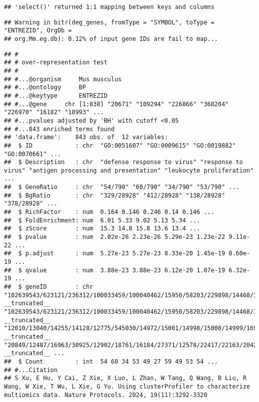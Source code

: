 \documentclass[
]{article}
\newenvironment{Shaded}{\begin{snugshade}}{\end{snugshade}}
\newcommand{\AttributeTok}[1]{\textcolor[rgb]{0.13,0.29,0.53}{#1}}
\newcommand{\CommentTok}[1]{\textcolor[rgb]{0.56,0.35,0.01}{\textit{#1}}}
\newcommand{\FunctionTok}[1]{\textcolor[rgb]{0.13,0.29,0.53}{\textbf{#1}}}
\newcommand{\NormalTok}[1]{#1}
\newcommand{\OtherTok}[1]{\textcolor[rgb]{0.56,0.35,0.01}{#1}}
\newcommand{\SpecialCharTok}[1]{\textcolor[rgb]{0.81,0.36,0.00}{\textbf{#1}}}
\newcommand{\StringTok}[1]{\textcolor[rgb]{0.31,0.60,0.02}{#1}}
\begin{document}
\begin{verbatim}
## 'select()' returned 1:1 mapping between keys and columns
\end{verbatim}

\begin{verbatim}
## Warning in bitr(deg_genes, fromType = "SYMBOL", toType = "ENTREZID", OrgDb =
## org.Mm.eg.db): 0.12% of input gene IDs are fail to map...
\end{verbatim}

\begin{Shaded}
\end{Shaded}

\begin{verbatim}
## #
## # over-representation test
## #
## #...@organism     Mus musculus 
## #...@ontology     BP 
## #...@keytype      ENTREZID 
## #...@gene     chr [1:838] "20671" "109294" "226866" "368204" "226970" "16182" "18993" ...
## #...pvalues adjusted by 'BH' with cutoff <0.05 
## #...843 enriched terms found
## 'data.frame':    843 obs. of  12 variables:
##  $ ID            : chr  "GO:0051607" "GO:0009615" "GO:0019882" "GO:0070661" ...
##  $ Description   : chr  "defense response to virus" "response to virus" "antigen processing and presentation" "leukocyte proliferation" ...
##  $ GeneRatio     : chr  "54/790" "60/790" "34/790" "53/790" ...
##  $ BgRatio       : chr  "329/28928" "412/28928" "138/28928" "378/28928" ...
##  $ RichFactor    : num  0.164 0.146 0.246 0.14 0.146 ...
##  $ FoldEnrichment: num  6.01 5.33 9.02 5.13 5.34 ...
##  $ zScore        : num  15.3 14.8 15.8 13.6 13.4 ...
##  $ pvalue        : num  2.02e-26 2.23e-26 5.29e-23 1.23e-22 9.11e-22 ...
##  $ p.adjust      : num  5.27e-23 5.27e-23 8.33e-20 1.45e-19 8.60e-19 ...
##  $ qvalue        : num  3.88e-23 3.88e-23 6.12e-20 1.07e-19 6.32e-19 ...
##  $ geneID        : chr  "102639543/623121/236312/100033459/100040462/15950/58203/229898/14468/14469/100038882/23962/231655/246728/246727"| __truncated__ "102639543/623121/236312/100033459/100040462/15950/58203/229898/14468/14469/18619/100038882/23962/231655/246728/"| __truncated__ "12010/13040/14255/14128/12775/545030/14972/15001/14998/15000/14999/16912/21354/16913/21355/15002/14961/14960/14"| __truncated__ "20849/12487/16963/30925/12902/18761/16184/27371/12578/22417/22163/20423/14255/93675/12518/12483/243958/12478/27"| __truncated__ ...
##  $ Count         : int  54 60 34 53 49 27 59 49 53 54 ...
## #...Citation
## S Xu, E Hu, Y Cai, Z Xie, X Luo, L Zhan, W Tang, Q Wang, B Liu, R Wang, W Xie, T Wu, L Xie, G Yu. Using clusterProfiler to characterize multiomics data. Nature Protocols. 2024, 19(11):3292-3320
\end{verbatim}
\end{document}
